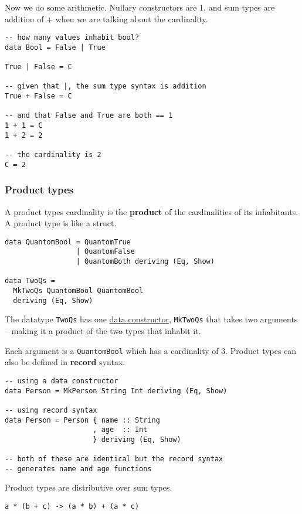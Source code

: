 Now we do some arithmetic. Nullary constructors are 1, and sum types are addition of + when we are talking
about the cardinality.

\begin{verbatim}
-- how many values inhabit bool?
data Bool = False | True

True | False = C

-- given that |, the sum type syntax is addition
True + False = C

-- and that False and True are both == 1
1 + 1 = C
1 + 2 = 2

-- the cardinality is 2
C = 2
\end{verbatim}

\subsubsection{Product types}
A product types cardinality is the \textbf{product} of the cardinalities of its inhabitants.
A product type is like a struct.

\begin{lstlisting}
data QuantomBool = QuantomTrue
                 | QuantomFalse
                 | QuantomBoth deriving (Eq, Show)

data TwoQs =
  MkTwoQs QuantomBool QuantomBool
  deriving (Eq, Show)
\end{lstlisting}

The datatype \texttt{TwoQs} has one \underline{data constructor}, \texttt{MkTwoQs} that takes
two arguments -- making it a product of the two types that inhabit it.

Each argument is a \texttt{QuantomBool} which has a cardinality of 3.
Product types can also be defined in \textbf{record} syntax.

\begin{lstlisting}
-- using a data constructor
data Person = MkPerson String Int deriving (Eq, Show)

-- using record syntax
data Person = Person { name :: String
                     , age  :: Int 
                     } deriving (Eq, Show)

-- both of these are identical but the record syntax
-- generates name and age functions
\end{lstlisting}

Product types are distributive over sum types.
\begin{verbatim}
a * (b + c) -> (a * b) + (a * c)
\end{verbatim}

